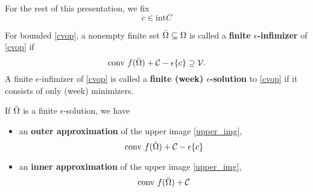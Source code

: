 \documentclass[10pt,xcolor={table,dvipsnames},t,unknownkeysallowed]{beamer}
\newcommand{\cone}[1]{\mathcal{#1}}
\newcommand{\bfemph}[1]{\textbf{\alert{#1}}}
\newcommand{\intr}{\text{int}}
\begin{document}
\begin{frame}{}
    For the rest of this presentation, we fix
    \[
    c\in \intr{C}
    \]
    \begin{definition}
        For bounded \eqref{cvop}, a nonempty finite set $\Bar{\Omega}\subseteq \Omega$ is called a \bfemph{finite $\epsilon$-infimizer} of \eqref{cvop} if
        \[
        \text{conv }f(\Bar{\Omega})+\cone{C}-\epsilon\{c\}\supseteq \cone{V}.
        \]
        A finite $\epsilon$-infimizer of \eqref{cvop} is called a \bfemph{finite (week) $\epsilon$-solution} to \eqref{cvop} if it consists of only (week) minimizers.
    \end{definition}
    If $\Bar{\Omega}$ is a finite $\epsilon$-solution, we have 
    \begin{itemize}
        \item an \textbf{\alert{outer approximation}} of the upper image \eqref{upper_img},
        \begin{equation}\label{outer_approx}
            \text{conv } f(\Bar{\Omega}) + \cone{C} -\epsilon\{c\}
        \end{equation}
        \item an \textbf{\alert{inner approximation}} of the upper image \eqref{upper_img},
        \begin{equation}\label{inner_approx}
            \text{conv } f(\Bar{\Omega}) + \cone{C} 
        \end{equation}
    \end{itemize}
\end{frame}
\end{document}
